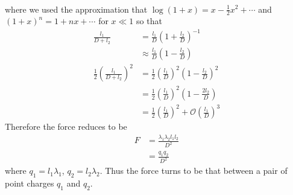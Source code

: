 \documentclass{esg8022pset}
\begin{document}
\begin{solution}
\begin{enumerate}[(a)]
\begin{align*}
    \end{align*}
    where we used the approximation that $\log(1 + x) = x - \frac12x^2 + \cdots$ and $(1 + x)^n = 1 + nx + \cdots$ for $x \ll 1$ so that
    \begin{align*}
      \frac{l_1}{D + l_2} & = \frac{l_1}{D}(1 + \frac{l_2}{D})^{-1} \\
        & \approx \frac{l_1}{D}(1 - \frac{l_2}{D}) \\
      \frac12 \left(\frac{l_1}{D + l_2}\right)^2 & = \frac12 \left(\frac{l_1}{D}\right)^2(1 - \frac{l_2}{D})^2 \\
        & = \frac12 \left(\frac{l_1}{D}\right)^2(1 - \frac{2l_2}{D}) \\
        & = \frac12 \left(\frac{l_1}{D}\right)^2 + \mathcal O\left(\frac{l_1}{D}\right)^3
    \end{align*}
    Therefore the force reduces to be
    \begin{align*}
      F & = \frac{\lambda_1 \lambda_2 l_1 l_2}{D^2} \\
        & = \frac{q_1 q_2}{D^2}
    \end{align*}
    where $q_1 = l_1\lambda_1$, $q_2 = l_2\lambda_2$.  Thus the force turns to be that between a pair of point charges $q_1$ and $q_2$.
  \end{enumerate}
\end{solution}
\end{document}
